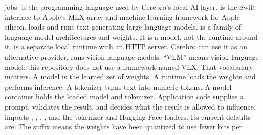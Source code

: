 {}jobs:\markdownRendererInterblockSeparator
{}\markdownRendererUlBegin
\markdownRendererUlItem {} is the programming language used by Cerebro's local-AI layer.\markdownRendererUlItemEnd 
\markdownRendererUlItem {} is the Swift interface to Apple's MLX array and machine-learning\markdownRendererSoftLineBreak
{}framework for Apple silicon.\markdownRendererUlItemEnd 
\markdownRendererUlItem {} loads and runs text-generating large language models.\markdownRendererUlItemEnd 
\markdownRendererUlItem {} is a family of language-model architectures and weights. It is a\markdownRendererSoftLineBreak
{}model, not the runtime around it.\markdownRendererUlItemEnd 
\markdownRendererUlItem {} is a separate local runtime with an HTTP server. Cerebro can\markdownRendererSoftLineBreak
{}use it as an alternative provider.\markdownRendererUlItemEnd 
\markdownRendererUlItem {} runs vision-language models. “VLM” means vision-language model;\markdownRendererSoftLineBreak
{}this repository does not use a framework named VLX.\markdownRendererUlItemEnd 
\markdownRendererUlEnd \markdownRendererInterblockSeparator
{}That vocabulary matters. A model is the learned set of weights. A runtime\markdownRendererSoftLineBreak
{}loads the weights and performs inference. A tokenizer turns text into numeric\markdownRendererSoftLineBreak
{}tokens. A model container holds the loaded model and tokenizer. Application\markdownRendererSoftLineBreak
{}code supplies a prompt, validates the result, and decides what the result is\markdownRendererSoftLineBreak
{}allowed to influence.\markdownRendererInterblockSeparator
{}\markdownRendererSectionBegin
{}\markdownRendererInterblockSeparator
{} imports , , , , and the\markdownRendererSoftLineBreak
{}tokenizer and Hugging Face loaders. Its current defaults are:\markdownRendererInterblockSeparator
{}\markdownRendererInterblockSeparator
{}The suffix  means the weights have been quantized to use fewer bits per\markdownRendererSoftLineBreak
